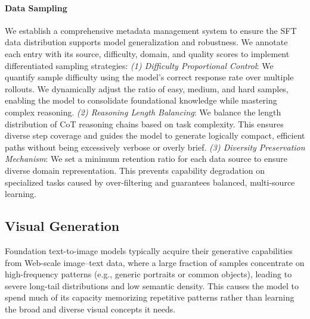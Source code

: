 \documentclass{article}
\begin{document}
\paragraph{Data Sampling} 
We establish a comprehensive metadata management system to ensure the SFT data distribution supports model generalization and robustness. We annotate each entry with its source, difficulty, domain, and quality scores to implement differentiated sampling strategies:
\textit{(1) Difficulty Proportional Control}: We quantify sample difficulty using the model's correct response rate over multiple rollouts. We dynamically adjust the ratio of easy, medium, and hard samples, enabling the model to consolidate foundational knowledge while mastering complex reasoning.
\textit{(2) Reasoning Length Balancing}: We balance the length distribution of CoT reasoning chains based on task complexity. This ensures diverse step coverage and guides the model to generate logically compact, efficient paths without being excessively verbose or overly brief.
\textit{(3) Diversity Preservation Mechanism}: We set a minimum retention ratio for each data source to ensure diverse domain representation. This prevents capability degradation on specialized tasks caused by over-filtering and guarantees balanced, multi-source learning.



\subsection{Visual Generation}


Foundation text-to-image models typically acquire their generative capabilities from Web-scale image–text data, where a large fraction of samples concentrate on high-frequency patterns (e.g., generic portraits or common objects), leading to severe long-tail distributions and low semantic density. This causes the model to spend much of its capacity memorizing repetitive patterns rather than learning the broad and diverse visual concepts it needs.
\end{document}
